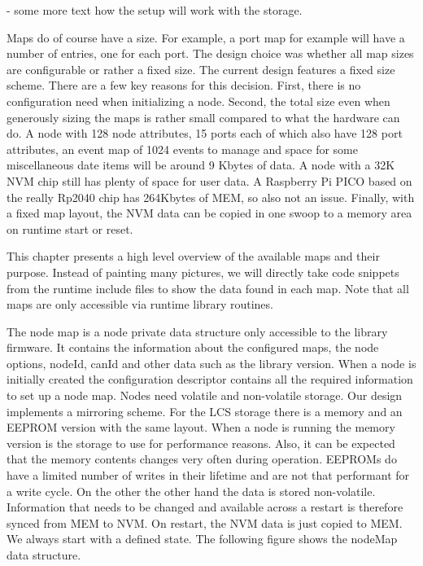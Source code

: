 - some more text how the setup will work with the storage.


Maps do of course have a size. For example, a port map for example will have a number of entries, one for each port. The design choice was whether all map sizes are configurable or rather a fixed size. The current design features a fixed size scheme. There are a few key reasons for this decision. First, there is no configuration need when initializing a node. Second, the total size even when generously sizing the maps is rather small compared to what the hardware can do. A node with 128 node attributes, 15 ports each of which also have 128 port attributes, an event map of 1024 events to manage and space for some miscellaneous date items will be around 9 Kbytes of data. A node with a 32K NVM chip still has plenty of space for user data. A Raspberry Pi PICO based on the really Rp2040 chip has 264Kbytes of MEM, so also not an issue. Finally, with a fixed map layout, the NVM data can be copied in one swoop to a memory area on runtime start or reset. 

\FloatBarrier

This chapter presents a high level overview of the available maps and their purpose. Instead of painting many pictures, we will directly take code snippets from the runtime include files to show the data found in each map. Note that all maps are only accessible via runtime library routines.


The node map is a node private data structure only accessible to the library firmware. It contains the information about the configured maps, the node options, nodeId, canId and other data such as the library version. When a node is initially created the configuration descriptor contains all the required information to set up a node map. Nodes need volatile and non-volatile storage. Our design implements a mirroring scheme. For the LCS storage there is a memory and an EEPROM version with the same layout. When a node is running the memory version is the storage to use for performance reasons. Also, it can be expected that the memory contents changes very often during operation. EEPROMs do have a limited number of writes in their lifetime and are not that performant for a write cycle. On the other the other hand the data is stored non-volatile. Information that needs to be changed and available across a restart is therefore synced from MEM to NVM. On restart, the NVM data is just copied to MEM. We always start with a defined state. The following figure shows the nodeMap data structure.

